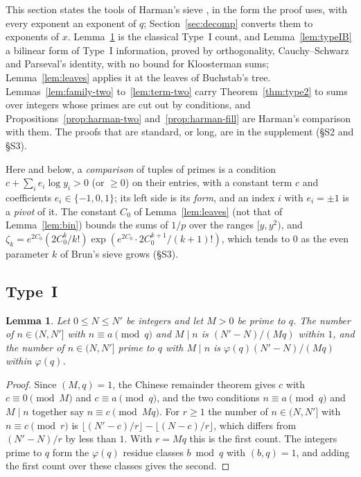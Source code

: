 \documentclass[11pt]{article}
\newtheorem{lemma}[theorem]{Lemma}
\theoremstyle{definition}
\begin{document}
This section states the tools of Harman's sieve \cite{harman83}, \cite[Chapter~3]{harman} in the form the proof uses,
with every exponent an exponent of $q$; Section~\ref{sec:decomp} converts them to exponents of $x$.
Lemma~\ref{lem:type1} is the classical Type~I count, and Lemma~\ref{lem:typeIB} a bilinear form of Type~I information,
proved by orthogonality, Cauchy--Schwarz and Parseval's identity, with no bound for
Kloosterman sums; Lemma~\ref{lem:leaves} applies it at the
leaves of Buchstab's tree. Lemmas~\ref{lem:family-two} to~\ref{lem:term-two} carry Theorem~\ref{thm:type2} to sums over
integers whose primes are cut out by conditions, and Propositions~\ref{prop:harman-two} and~\ref{prop:harman-fill} are
Harman's comparison with them. The proofs that are standard, or long, are in the supplement (\S S2 and \S S3).

Here and below, a \emph{comparison} of tuples of primes is a condition $c + \sum_i e_i \log y_i > 0$ (or $\ge 0$) on
their entries, with a constant term $c$ and coefficients $e_i \in \{-1, 0, 1\}$; its left side is its \emph{form}, and
an index $i$ with $e_i = \pm 1$ is a \emph{pivot} of it. The constant $C_0$ of Lemma~\ref{lem:leaves} (not that of
Lemma~\ref{lem:bin}) bounds the sums of $1/p$ over the ranges $[y, y^2)$, and
$\zeta_k = e^{2C_0} (2C_0^k/k!) \exp(e^{2C_0} \cdot 2C_0^{k + 1}/(k + 1)!)$, which tends to $0$ as the even parameter
$k$ of Brun's sieve grows (\S S3).

\subsection{Type~I}

\begin{lemma}\label{lem:type1}
Let $0 \le N \le N'$ be integers and let $M > 0$ be prime to $q$. The number of $n \in (N, N']$ with $n \equiv a \pmod
q$ and $M \mid n$ is $(N' - N)/(Mq)$ within $1$, and the number of $n \in (N, N']$ prime to $q$ with $M \mid n$ is
$\varphi(q)(N' - N)/(Mq)$ within $\varphi(q)$.
\end{lemma}

\begin{proof}
Since $(M, q) = 1$, the Chinese remainder theorem gives $c$ with $c \equiv 0 \pmod M$ and $c \equiv a \pmod q$, and
the two conditions $n \equiv a \pmod q$ and $M \mid n$ together say $n \equiv c \pmod{Mq}$. For $r \ge 1$ the number of
$n \in (N, N']$ with $n \equiv c \pmod r$ is $\lfloor (N' - c)/r \rfloor - \lfloor (N - c)/r \rfloor$, which
differs from $(N' - N)/r$ by less than $1$. With $r = Mq$ this is the first count. The integers prime to $q$ form the
$\varphi(q)$ residue classes $b \bmod q$ with $(b, q) = 1$, and adding the first count over these classes gives the
second.
\end{proof}
\end{document}
